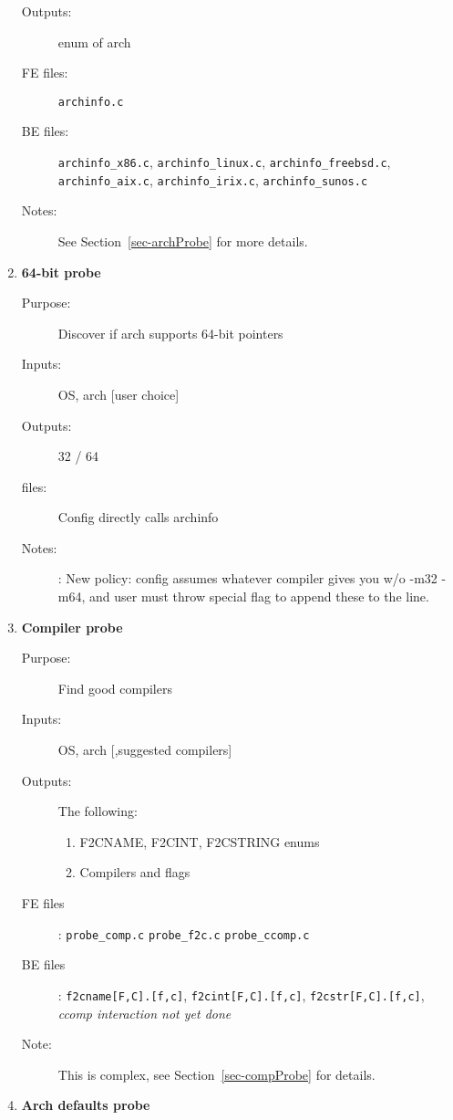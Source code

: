 \documentclass[11pt]{article}
\begin{document}
\begin{enumerate}
\begin{description}
   \item [Outputs:] enum of arch
   \item [FE files:] {\tt archinfo.c}
   \item [BE files:] {\tt archinfo\_x86.c}, {\tt archinfo\_linux.c}, 
         {\tt archinfo\_freebsd.c}, {\tt archinfo\_aix.c},
         {\tt archinfo\_irix.c}, {\tt archinfo\_sunos.c}
   \item [Notes:] See Section~\ref{sec-archProbe} for more details.
   \end{description}
\item {\bf 64-bit probe}
   \begin{description}
   \item [Purpose:] Discover if arch supports 64-bit pointers
   \item [Inputs:]  OS, arch [user choice]
   \item [Outputs:] 32 / 64
   \item [files:] Config directly calls archinfo
   \item [Notes:]: New policy: config assumes whatever compiler gives you w/o
                   -m32 -m64, and user must throw special flag to append these
                   to the line.
   \end{description}
\item {\bf Compiler probe}
   \begin{description}
   \item [Purpose:] Find good compilers
   \item [Inputs:]  OS, arch [,suggested compilers]
   \item [Outputs:] The following:
      \begin{enumerate}
      \item F2CNAME, F2CINT, F2CSTRING enums
      \item Compilers and flags
      \end{enumerate}
   \item [FE files]: {\tt probe\_comp.c} {\tt probe\_f2c.c} {\tt probe\_ccomp.c}
   \item [BE files]: {\tt f2cname[F,C].[f,c]}, {\tt f2cint[F,C].[f,c]},  
                     {\tt f2cstr[F,C].[f,c]}, 
                     {\it ccomp interaction not yet done}
   \item [Note:] This is complex, see Section~\ref{sec-compProbe} for details.
   \end{description}
\item {\bf Arch defaults probe}
   \begin{description}

\end{description}
\end{enumerate}
\end{document}
